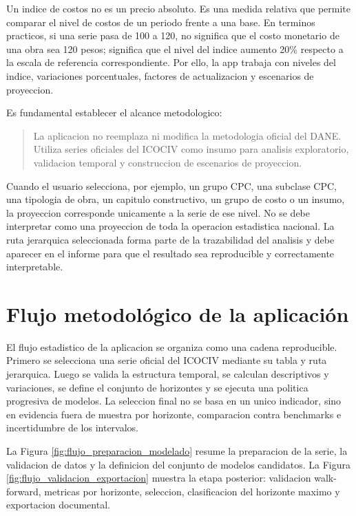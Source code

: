 ﻿\documentclass[12pt,letterpaper]{article}
\newcommand{\ICOCIV}{ICOCIV}
\begin{document}
Un indice de costos no es un precio absoluto. Es una medida relativa que permite comparar el nivel de costos de un periodo frente a una base. En terminos practicos, si una serie pasa de 100 a 120, no significa que el costo monetario de una obra sea 120 pesos; significa que el nivel del indice aumento 20\% respecto a la escala de referencia correspondiente. Por ello, la app trabaja con niveles del indice, variaciones porcentuales, factores de actualizacion y escenarios de proyeccion.

Es fundamental establecer el alcance metodologico:

\begin{quote}
La aplicacion no reemplaza ni modifica la metodologia oficial del DANE. Utiliza series oficiales del \ICOCIV{} como insumo para analisis exploratorio, validacion temporal y construccion de escenarios de proyeccion.
\end{quote}

Cuando el usuario selecciona, por ejemplo, un grupo CPC, una subclase CPC, una tipologia de obra, un capitulo constructivo, un grupo de costo o un insumo, la proyeccion corresponde unicamente a la serie de ese nivel. No se debe interpretar como una proyeccion de toda la operacion estadistica nacional. La ruta jerarquica seleccionada forma parte de la trazabilidad del analisis y debe aparecer en el informe para que el resultado sea reproducible y correctamente interpretable.



\section{Flujo metodológico de la aplicación}

El flujo estadistico de la aplicacion se organiza como una cadena reproducible. Primero se selecciona una serie oficial del \ICOCIV{} mediante su tabla y ruta jerarquica. Luego se valida la estructura temporal, se calculan descriptivos y variaciones, se define el conjunto de horizontes y se ejecuta una politica progresiva de modelos. La seleccion final no se basa en un unico indicador, sino en evidencia fuera de muestra por horizonte, comparacion contra benchmarks e incertidumbre de los intervalos.

La Figura \ref{fig:flujo_preparacion_modelado} resume la preparacion de la serie, la validacion de datos y la definicion del conjunto de modelos candidatos. La Figura \ref{fig:flujo_validacion_exportacion} muestra la etapa posterior: validacion walk-forward, metricas por horizonte, seleccion, clasificacion del horizonte maximo y exportacion documental.
\end{document}

